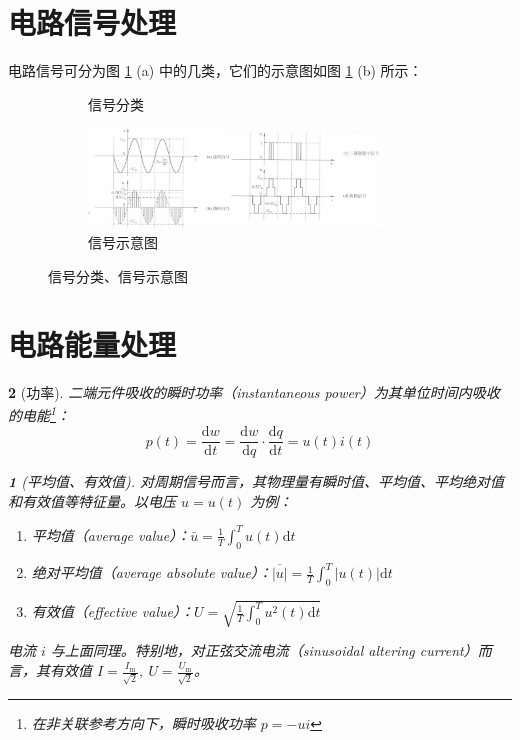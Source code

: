 \documentclass[UTF8]{report}
\theoremstyle{MyLineTheoremStyle} %
\theoremstyle{MyBlockTheoremStyle} %
\theoremstyle{MySubsubsectionStyle} %
\newtheorem{definition}{}
\begin{document}
\section{电路信号处理}

电路信号可分为图 \ref{信号分类、信号示意图} (a) 中的几类，它们的示意图如图 \ref{信号分类、信号示意图} (b) 所示： 

\begin{figure}[H]\centering
\begin{subfigure}[t]{0.52\textwidth}\centering
    
    \caption{ 信号分类 }
\end{subfigure}\begin{subfigure}[t]{0.48\textwidth}\centering
    \includegraphics[height=75pt]{assets/1,2/1b9e0bed85e1f3a049de96f4c6018da8.jpg}
    \caption{ 信号示意图 }
\end{subfigure}
\caption{ 信号分类、信号示意图 }\label{信号分类、信号示意图}
\end{figure}

\section{电路能量处理}

\begin{definition}[功率]

二端元件吸收的瞬时功率（instantaneous power）为其单位时间内吸收的电能\footnote{在非关联参考方向下，瞬时吸收功率 $p = -ui$}：
\begin{equation*}
p(t) = \frac{\mathrm{d}w}{\mathrm{d}t} = \frac{\mathrm{d}w}{\mathrm{d}q}\cdot\frac{\mathrm{d}q}{\mathrm{d}t} = u(t)i(t) 
\end{equation*}


\begin{definition}[平均值、有效值]
对周期信号而言，其物理量有瞬时值、平均值、平均绝对值和有效值等特征量。以电压 $u = u(t)$ 为例：

\begin{enumerate}
\item 平均值（average value）：$\bar{u} = \frac{1}{T}\int_0^T u(t)\mathrm{d}t$
\item 绝对平均值（average absolute value）：$\overline{| u |} = \frac{1}{T}\int_0^T | u(t) |\mathrm{d}t$
\item 有效值（effective value）：$ U = \sqrt{\frac{1}{T}\int_0^T u^2(t)\mathrm{d}t} $
\end{enumerate}
电流 $i$ 与上面同理。特别地，对正弦交流电流（sinusoidal altering current）而言，其有效值 $I = \frac{I_{\mathrm{m}}}{\sqrt{2}},\ U = \frac{U_{\mathrm{m}}}{\sqrt{2}}$。
\end{definition}


\end{definition}
\end{document}
